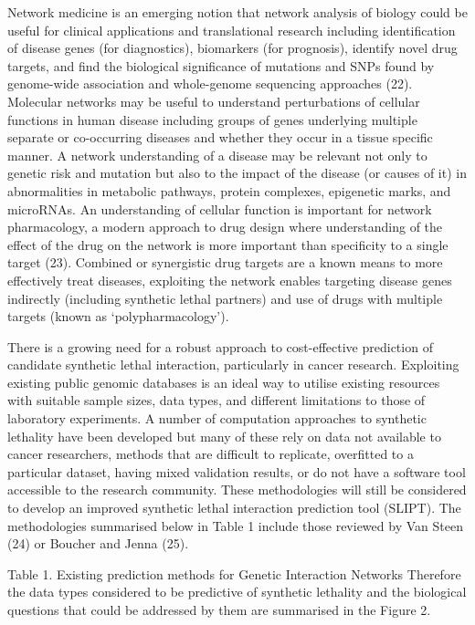 Network medicine is an emerging notion that network analysis of biology could be useful for clinical applications and translational research including identification of disease genes (for diagnostics), biomarkers (for prognosis), identify novel drug targets, and find the biological significance of mutations and SNPs found by genome-wide association and whole-genome sequencing approaches (22). Molecular networks may be useful to understand perturbations of cellular functions in human disease including groups of genes underlying multiple separate or co-occurring diseases and whether they occur in a tissue specific manner. A network understanding of a disease may be relevant not only to genetic risk and mutation but also to the impact of the disease (or causes of it) in abnormalities in metabolic pathways, protein complexes, epigenetic marks, and microRNAs. An understanding of cellular function is important for network pharmacology, a modern approach to drug design where understanding of the effect of the drug on the network is more important than specificity to a single target (23). Combined or synergistic drug targets are a known means to more effectively treat diseases, exploiting the network enables targeting disease genes indirectly (including synthetic lethal partners) and use of drugs with multiple targets (known as ‘polypharmacology’). 

There is a growing need for a robust approach to cost-effective prediction of candidate synthetic lethal interaction, particularly in cancer research. Exploiting existing public genomic databases is an ideal way to utilise existing resources with suitable sample sizes, data types, and different limitations to those of laboratory experiments. A number of computation approaches to synthetic lethality have been developed but many of these rely on data not available to cancer researchers, methods that are difficult to replicate, overfitted to a particular dataset, having mixed validation results, or do not have a software tool accessible to the research community. These methodologies will still be considered to develop an improved synthetic lethal interaction prediction tool (SLIPT). The methodologies summarised below in Table 1 include those reviewed by Van Steen (24) or Boucher and Jenna (25). 

Table 1. Existing prediction methods for Genetic Interaction Networks
Therefore the data types considered to be predictive of synthetic lethality and the biological questions that could be addressed by them are summarised in the Figure 2. 
 
